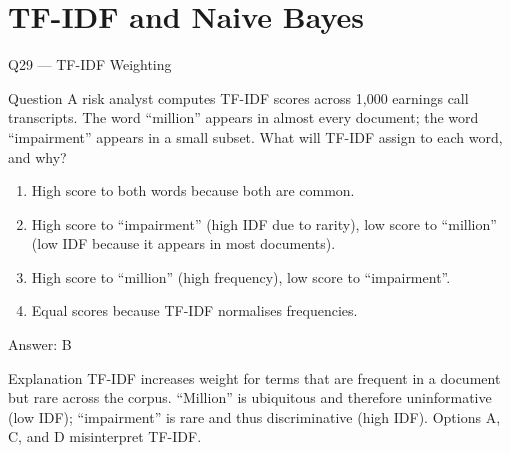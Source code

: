 \documentclass[aspectratio=169,8pt]{beamer}
\begin{document}
	\section{TF-IDF and Naive Bayes}
	
	\begin{frame}{Q29 --- TF-IDF Weighting}
		\begin{block}{Question}
			A risk analyst computes TF-IDF scores across 1,000 earnings call transcripts. The word ``million'' appears in almost every document; the word ``impairment'' appears in a small subset. What will TF-IDF assign to each word, and why?
			\begin{enumerate}
				\item High score to both words because both are common.
				\item High score to ``impairment'' (high IDF due to rarity), low score to ``million'' (low IDF because it appears in most documents).
				\item High score to ``million'' (high frequency), low score to ``impairment''.
				\item Equal scores because TF-IDF normalises frequencies.
			\end{enumerate}
		\end{block}
		\begin{exampleblock}{Answer: B}\end{exampleblock}
		\begin{block}{Explanation}
			TF-IDF increases weight for terms that are frequent in a document but rare across the corpus. ``Million'' is ubiquitous and therefore uninformative (low IDF); ``impairment'' is rare and thus discriminative (high IDF). Options A, C, and D misinterpret TF-IDF.
		\end{block}
	\end{frame}
	
\end{document}
